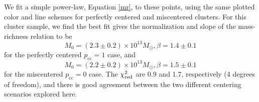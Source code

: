 We fit a simple power-law, Equation \ref{mr}, to these points, using the same plotted color and line schemes for perfectly centered and miscentered clusters. For this cluster sample, we find the best fit gives the normalization and slope of the mass-richness relation to be
\begin{equation}
M_0 = (2.3 \pm 0.2) \times 10^{13} M_\odot, \beta = 1.4 \pm 0.1
\end{equation}
for the perfectly centered $p_{\mathrm{cc}}=1$ case, and
\begin{equation}
M_0 = (2.2 \pm 0.2) \times 10^{13} M_\odot, \beta = 1.5 \pm 0.1
\end{equation}
for the miscentered $p_{\mathrm{cc}}=0$ case. The $\chi^2_{\rm red}$ are 0.9 and 1.7, respectively (4 degrees of freedom), and there is good agreement between the two different centering scenarios explored here.

